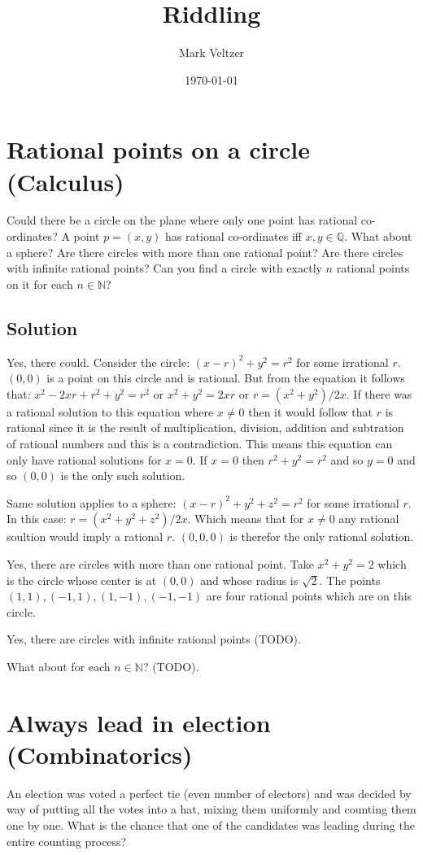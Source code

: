 \documentclass{article}
\title{Riddling}
\author{Mark Veltzer}
\date{\today}
\begin{document}
\maketitle

\tableofcontents

\section{Rational points on a circle (Calculus)}
Could there be a circle on the plane where only one point has rational co-ordinates? A point $p=(x,y)$ has rational co-ordinates iff $x,y\in\mathbb{Q}$. What about a sphere? Are there circles with more than one rational point? Are there circles with infinite rational points? Can you find a circle with exactly $n$ rational points on it for each $n\in\mathbb{N}$?

\subsection{Solution}
Yes, there could. Consider the circle: $(x-r)^2+y^2=r^2$ for some irrational $r$.
$(0,0)$ is a point on this circle and is rational. But from the equation it follows
that: $x^2-2xr+r^2+y^2=r^2$ or $x^2+y^2=2xr$ or $r=(x^2+y^2)/2x$. If there
was a rational solution to this equation where $x\ne0$ then it would follow that
$r$ is rational since it is the result of multiplication, division, addition and subtration
of rational numbers and this is a contradiction. This means this equation can only
have rational solutions for $x=0$. If $x=0$ then $r^2+y^2=r^2$ and so $y=0$ and so
$(0,0)$ is the only such solution.

Same solution applies to a sphere: $(x-r)^2+y^2+z^2=r^2$ for some irrational $r$.
In this case: $r=(x^2+y^2+z^2)/2x$. Which means that for $x\ne0$ any rational soultion would imply a rational $r$.
$(0,0,0)$ is therefor the only rational solution.

Yes, there are circles with more than one rational point. Take $x^2+y^2=2$ which is the circle whose
center is at $(0,0)$ and whose radius is $\sqrt{2}$. The points $(1,1),(-1,1),(1,-1),(-1,-1)$ are four rational
points which are on this circle.

Yes, there are circles with infinite rational points (TODO).

What about for each $n\in\mathbb{N}$? (TODO).

\section{Always lead in election (Combinatorics)}
An election was voted a perfect tie (even number of electors) and was decided by way of putting
all the votes into a hat, mixing them uniformly and counting them one by one. What is the chance
that one of the candidates was leading during the entire counting process?
\end{document}

